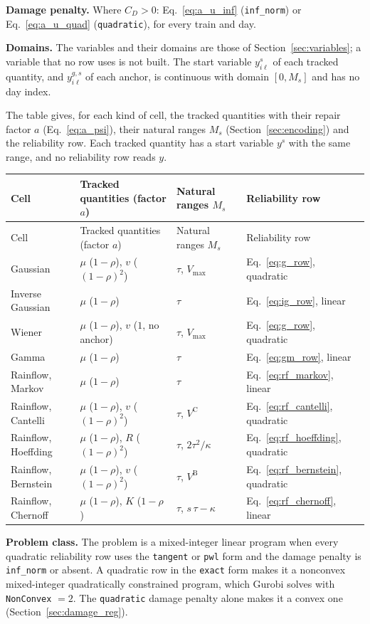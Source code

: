 \textbf{Damage penalty.} Where $C_D > 0$: Eq.~\eqref{eq:a_u_inf}
(\texttt{inf\_norm}) or Eq.~\eqref{eq:a_u_quad} (\texttt{quadratic}), for every train
and day.

\textbf{Domains.} The variables and their domains are those of
Section~\ref{sec:variables}; a variable that no row uses is not built. The start
variable $y^s_{i\ell}$ of each tracked quantity, and $y^{g,s}_{i\ell}$ of each anchor,
is continuous with domain $[0, M_s]$ and has no day index.

The table gives, for each kind of cell, the tracked quantities with their repair
factor $a$ (Eq.~\eqref{eq:a_psi}), their natural ranges $M_s$
(Section~\ref{sec:encoding}) and the reliability row. Each tracked quantity has a
start variable $y^s$ with the same range, and no reliability row reads $y$.

\begingroup\small
\begin{longtable}{@{}L{3.1cm}L{4.4cm}L{3.0cm}L{4.0cm}@{}}
\toprule
Cell & Tracked quantities (factor $a$) & Natural ranges $M_s$ & Reliability row \\
\midrule
\endfirsthead
\toprule
Cell & Tracked quantities (factor $a$) & Natural ranges $M_s$ & Reliability row \\
\midrule
\endhead
Gaussian & $\mu$ ($1-\rho$), $v$ ($(1-\rho)^2$) & $\tau$, $V_{\max}$ &
  Eq.~\eqref{eq:g_row}, quadratic \\
Inverse Gaussian & $\mu$ ($1-\rho$) & $\tau$ & Eq.~\eqref{eq:ig_row}, linear \\
Wiener & $\mu$ ($1-\rho$), $v$ ($1$, no anchor) & $\tau$, $V_{\max}$ &
  Eq.~\eqref{eq:g_row}, quadratic \\
Gamma & $\mu$ ($1-\rho$) & $\tau$ & Eq.~\eqref{eq:gm_row}, linear \\
Rainflow, Markov & $\mu$ ($1-\rho$) & $\tau$ & Eq.~\eqref{eq:rf_markov}, linear \\
Rainflow, Cantelli & $\mu$ ($1-\rho$), $v$ ($(1-\rho)^2$) & $\tau$, $V^{\mathrm{C}}$ &
  Eq.~\eqref{eq:rf_cantelli}, quadratic \\
Rainflow, Hoeffding & $\mu$ ($1-\rho$), $R$ ($(1-\rho)^2$) & $\tau$, $2\tau^2/\kappa$ &
  Eq.~\eqref{eq:rf_hoeffding}, quadratic \\
Rainflow, Bernstein & $\mu$ ($1-\rho$), $v$ ($(1-\rho)^2$) & $\tau$, $V^{\mathrm{B}}$ &
  Eq.~\eqref{eq:rf_bernstein}, quadratic \\
Rainflow, Chernoff & $\mu$ ($1-\rho$), $K$ ($1-\rho$) & $\tau$, $s\,\tau - \kappa$ &
  Eq.~\eqref{eq:rf_chernoff}, linear \\
\bottomrule
\end{longtable}
\endgroup

\textbf{Problem class.} The problem is a mixed-integer linear program when every
quadratic reliability row uses the \texttt{tangent} or \texttt{pwl} form and the
damage penalty is \texttt{inf\_norm} or absent. A quadratic row in the \texttt{exact}
form makes it a nonconvex mixed-integer quadratically constrained program, which
Gurobi solves with \texttt{NonConvex} $= 2$. The \texttt{quadratic} damage penalty
alone makes it a convex one (Section~\ref{sec:damage_reg}).
